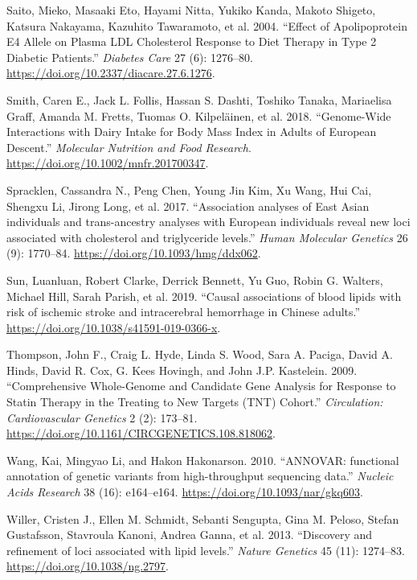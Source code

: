 \documentclass[]{article}
\begin{document}
\leavevmode\hypertarget{ref-Saito2004}{}%
Saito, Mieko, Masaaki Eto, Hayami Nitta, Yukiko Kanda, Makoto Shigeto,
Katsura Nakayama, Kazuhito Tawaramoto, et al. 2004. ``Effect of
Apolipoprotein E4 Allele on Plasma LDL Cholesterol Response to Diet
Therapy in Type 2 Diabetic Patients.'' \emph{Diabetes Care} 27 (6):
1276--80. \url{https://doi.org/10.2337/diacare.27.6.1276}.

\leavevmode\hypertarget{ref-Smith2018}{}%
Smith, Caren E., Jack L. Follis, Hassan S. Dashti, Toshiko Tanaka,
Mariaelisa Graff, Amanda M. Fretts, Tuomas O. Kilpeläinen, et al. 2018.
``Genome-Wide Interactions with Dairy Intake for Body Mass Index in
Adults of European Descent.'' \emph{Molecular Nutrition and Food
Research}. \url{https://doi.org/10.1002/mnfr.201700347}.

\leavevmode\hypertarget{ref-Spracklen2017}{}%
Spracklen, Cassandra N., Peng Chen, Young Jin Kim, Xu Wang, Hui Cai,
Shengxu Li, Jirong Long, et al. 2017. ``Association analyses of East
Asian individuals and trans-ancestry analyses with European individuals
reveal new loci associated with cholesterol and triglyceride levels.''
\emph{Human Molecular Genetics} 26 (9): 1770--84.
\url{https://doi.org/10.1093/hmg/ddx062}.

\leavevmode\hypertarget{ref-Sun2019}{}%
Sun, Luanluan, Robert Clarke, Derrick Bennett, Yu Guo, Robin G. Walters,
Michael Hill, Sarah Parish, et al. 2019. ``Causal associations of blood
lipids with risk of ischemic stroke and intracerebral hemorrhage in
Chinese adults.'' \url{https://doi.org/10.1038/s41591-019-0366-x}.

\leavevmode\hypertarget{ref-Thompson2009}{}%
Thompson, John F., Craig L. Hyde, Linda S. Wood, Sara A. Paciga, David
A. Hinds, David R. Cox, G. Kees Hovingh, and John J.P. Kastelein. 2009.
``Comprehensive Whole-Genome and Candidate Gene Analysis for Response to
Statin Therapy in the Treating to New Targets (TNT) Cohort.''
\emph{Circulation: Cardiovascular Genetics} 2 (2): 173--81.
\url{https://doi.org/10.1161/CIRCGENETICS.108.818062}.

\leavevmode\hypertarget{ref-Wang2010}{}%
Wang, Kai, Mingyao Li, and Hakon Hakonarson. 2010. ``ANNOVAR: functional
annotation of genetic variants from high-throughput sequencing data.''
\emph{Nucleic Acids Research} 38 (16): e164--e164.
\url{https://doi.org/10.1093/nar/gkq603}.

\leavevmode\hypertarget{ref-Willer2013}{}%
Willer, Cristen J., Ellen M. Schmidt, Sebanti Sengupta, Gina M. Peloso,
Stefan Gustafsson, Stavroula Kanoni, Andrea Ganna, et al. 2013.
``Discovery and refinement of loci associated with lipid levels.''
\emph{Nature Genetics} 45 (11): 1274--83.
\url{https://doi.org/10.1038/ng.2797}.
\end{document}
